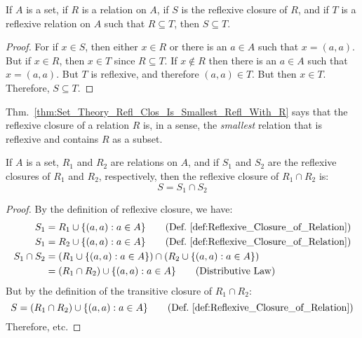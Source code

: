     \begin{theorem}
        \label{thm:Set_Theory_Refl_Clos_Is_Smallest_Refl_With_R}
        If $A$ is a set, if $R$ is a relation on $A$, if
        $S$ is the reflexive closure of $R$, and if $T$ is a
        reflexive relation on $A$ such that $R\subseteq{T}$, then
        $S\subseteq{T}$.
    \end{theorem}
    \begin{proof}
        For if $x\in{S}$, then either $x\in{R}$ or there is an
        $a\in{A}$ such that $x=(a,a)$. But if $x\in{R}$, then
        $x\in{T}$ since $R\subseteq{T}$. If $x\notin{R}$ then
        there is an $a\in{A}$ such that $x=(a,a)$. But $T$ is
        reflexive, and therefore $(a,a)\in{T}$. But then
        $x\in{T}$. Therefore, $S\subseteq{T}$.
    \end{proof}
    Thm.~\ref{thm:Set_Theory_Refl_Clos_Is_Smallest_Refl_With_R}
    says that the reflexive closure of a relation $R$ is, in a sense,
    the \textit{smallest} relation that is reflexive and contains
    $R$ as a subset.
    \begin{theorem}
        If $A$ is a set, $R_{1}$ and $R_{2}$ are relations on $A$,
        and if $S_{1}$ and $S_{2}$ are the reflexive closures of
        $R_{1}$ and $R_{2}$, respectively, then the reflexive closure
        of $R_{1}\cap{R}_{2}$ is:
        \begin{equation}
            S=S_{1}\cap{S}_{2}
        \end{equation}
    \end{theorem}
    \begin{proof}
        By the definition of reflexive closure, we have:
        \begin{align}
            S_{1}&=R_{1}\cup\{(a,a):a\in{A}\}
            \tag{Def.~\ref{def:Reflexive_Closure_of_Relation}}\\
            S_{1}&=R_{2}\cup\{(a,a):a\in{A}\}
            \tag{Def.~\ref{def:Reflexive_Closure_of_Relation}}\\
            \nonumber
            S_{1}\cap{S}_{2}&=
            (R_{1}\cup\{(a,a):a\in{A}\})
            \cap(R_{2}\cup\{(a,a):a\in{A}\})\\
            &=(R_{1}\cap{R}_{2})
            \cup\{(a,a):a\in{A}\}
            \tag{Distributive Law}
        \end{align}
        But by the definition of the transitive closure of
        $R_{1}\cap{R}_{2}$:
        \begin{equation}
            S=(R_{1}\cap{R}_{2})\cup\{(a,a):a\in{A}\}
            \tag{Def.~\ref{def:Reflexive_Closure_of_Relation}}
        \end{equation}
        Therefore, etc.
    \end{proof}
